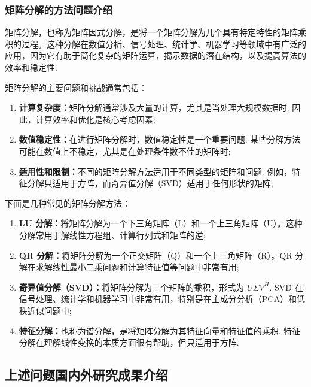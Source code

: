         \subsubsection{矩阵分解的方法问题介绍}
            \par 矩阵分解，也称为矩阵因式分解，是将一个矩阵分解为几个具有特定特性的矩阵乘积的过程。这种分解在数值分析、信号处理、统计学、机器学习等领域中有广泛的应用，因为它有助于简化复杂的矩阵运算，揭示数据的潜在结构，以及提高算法的效率和稳定性.
            \par 矩阵分解的主要问题和挑战通常包括：
            \begin{enumerate}
                \item \textbf{计算复杂度：}矩阵分解通常涉及大量的计算，尤其是当处理大规模数据时. 因此，计算效率和优化是核心考虑因素;
                \item \textbf{数值稳定性：}在进行矩阵分解时，数值稳定性是一个重要问题. 某些分解方法可能在数值上不稳定，尤其是在处理条件数不佳的矩阵时;
                \item \textbf{适用性和限制：}不同的矩阵分解方法适用于不同类型的矩阵和问题. 例如，特征分解只适用于方阵，而奇异值分解（SVD）适用于任何形状的矩阵;
            \end{enumerate}
            \par 下面是几种常见的矩阵分解方法：
            \begin{enumerate}
                \item \textbf{LU 分解：}将矩阵分解为一个下三角矩阵（L）和一个上三角矩阵（U）。这种分解常用于解线性方程组、计算行列式和矩阵的逆;
                \item \textbf{QR 分解：}将矩阵分解为一个正交矩阵（Q）和一个上三角矩阵（R）。QR 分解在求解线性最小二乘问题和计算特征值等问题中非常有用;
                \item \textbf{奇异值分解（SVD）：}将矩阵分解为三个矩阵的乘积，形式为 $U\varSigma V^H$. SVD 在信号处理、统计学和机器学习中非常有用，特别是在主成分分析（PCA）和低秩近似问题中;
                \item \textbf{特征分解：}也称为谱分解，是将矩阵分解为其特征向量和特征值的乘积. 特征分解在理解线性变换的本质方面很有帮助，但只适用于方阵.
            \end{enumerate}

    \subsection{上述问题国内外研究成果介绍}
